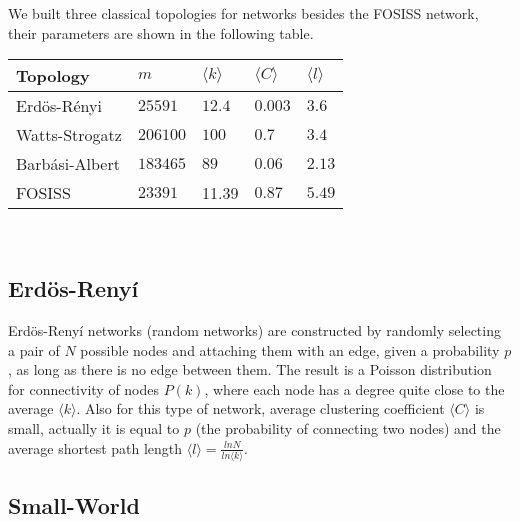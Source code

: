 \documentclass{bmcart}
\begin{document}
We built three classical topologies for networks besides the FOSISS network, their parameters are shown in the following table.\\


\begin{tabular}{| l |  l | l |l|l|}
\hline
\bf{Topology}       & $m$              & $\langle k \rangle$          & $\langle C \rangle$      & $\langle l \rangle$ \\ \hline
Erd\"{o}s-R\'enyi  &  $25591$      &  $12.4$        &  $0.003$ & $3.6$  \\ \hline
Watts-Strogatz    &  $206100$   &  $100$         &  $0.7$      & $3.4$  \\ \hline
Barb\'asi-Albert    &  $183465$   &  $89$           &  $0.06$    & $2.13$ \\ \hline
FOSISS                    &  $23391$     &   11.39     &  $0.87$    &  $5.49$ \\ \hline
\end{tabular}\\ 


\subsection*{Erd\"{o}s-Reny\'i}

Erd\"{o}s-Reny\'i networks \cite{ErdosRenyi:59} (random networks) are
constructed by randomly selecting a pair of $N$ possible nodes and
attaching them with an edge, given a probability $p$, as long as there
is no edge between them. The result is a Poisson distribution for
connectivity of nodes $P(k)$, where each node has a degree quite close
to the average $\langle k \rangle$. Also for this type of network,
average clustering coefficient $\langle C \rangle$ is small, actually
it is equal to $p$ (the probability of connecting two nodes) and the
average shortest path length
$\langle l \rangle = \frac{lnN}{ln\langle k \rangle}$.


\subsection*{Small-World}
\end{document}
